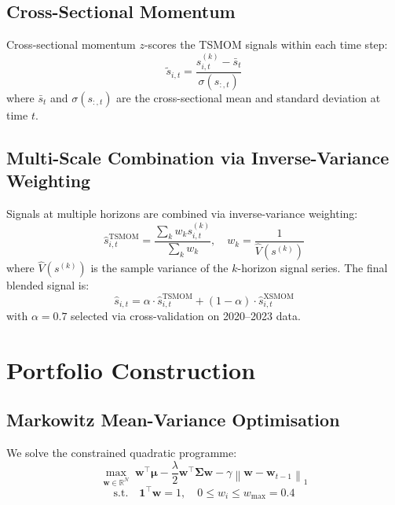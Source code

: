 \documentclass[11pt,a4paper]{article}
\newcommand{\R}{\mathbb{R}}
\newcommand{\bw}{\bm{w}}
\newcommand{\bmu}{\bm{\mu}}
\newcommand{\bSigma}{\bm{\Sigma}}
\newcommand{\norm}[1]{\left\lVert #1 \right\rVert}
\begin{document}
\subsection{Cross-Sectional Momentum}

Cross-sectional momentum $z$-scores the TSMOM signals within each time step:
\begin{equation}
  \tilde{s}_{i,t} = \frac{s^{(k)}_{i,t} - \bar{s}_t}{\sigma(s_{:,t})}
\end{equation}
where $\bar{s}_t$ and $\sigma(s_{:,t})$ are the cross-sectional mean and standard
deviation at time $t$.

\subsection{Multi-Scale Combination via Inverse-Variance Weighting}

Signals at multiple horizons are combined via inverse-variance weighting:
\begin{equation}
  \hat{s}_{i,t}^{\mathrm{TSMOM}} = \frac{\sum_k w_k s^{(k)}_{i,t}}{\sum_k w_k},
  \quad w_k = \frac{1}{\hat{V}(s^{(k)})}
\end{equation}
where $\hat{V}(s^{(k)})$ is the sample variance of the $k$-horizon signal series.
The final blended signal is:
\begin{equation}
  \hat{s}_{i,t} = \alpha \cdot \hat{s}_{i,t}^{\mathrm{TSMOM}} +
                  (1-\alpha) \cdot \hat{s}_{i,t}^{\mathrm{XSMOM}}
\end{equation}
with $\alpha = 0.7$ selected via cross-validation on 2020--2023 data.

\section{Portfolio Construction}

\subsection{Markowitz Mean-Variance Optimisation}

We solve the constrained quadratic programme:
\begin{equation}
  \max_{\bw \in \R^N} \; \bw^\top \bmu - \frac{\lambda}{2} \bw^\top \bSigma \bw
  - \gamma \norm{\bw - \bw_{t-1}}_1
\end{equation}
\begin{equation}
  \text{s.t.} \quad \mathbf{1}^\top \bw = 1, \quad 0 \leq w_i \leq w_{\max} = 0.4
\end{equation}
\end{document}
